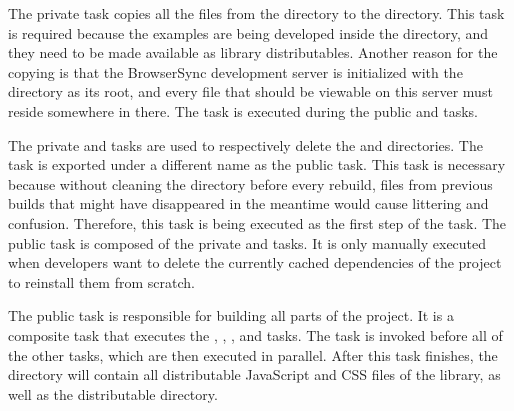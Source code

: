 The private  task copies all the files from the
 directory to the  directory.  This
task is required because the examples are being developed inside the
 directory, and they need to be made available as library
distributables.  Another reason for the copying is that the
BrowserSync development server is initialized with the 
directory as its root, and every file that should be viewable on this
server must reside somewhere in there.  The  task
is executed during the public  and  tasks.

The private  and  tasks are
used to respectively delete the  and 
directories.  The  task is exported under a different
name as the public  task.  This task is necessary because
without cleaning the  directory before every rebuild,
files from previous builds that might have disappeared in the meantime
would cause littering and confusion.  Therefore, this task is being
executed as the first step of the  task.  The public
 task is composed of the private  and
 tasks.  It is only manually executed when
developers want to delete the currently cached dependencies of the
project to reinstall them from scratch.

The public  task is responsible for building all parts of
the project.  It is a composite task that executes the ,
, , and  tasks.  The
 task is invoked before all of the other tasks, which are
then executed in parallel.  After this task finishes, the 
directory will contain all distributable JavaScript and CSS files of
the library, as well as the distributable  directory.

